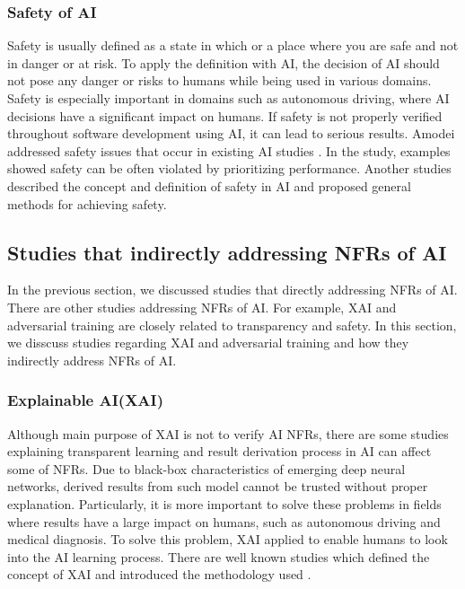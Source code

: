 \documentclass[symmetry,article,submit,moreauthors,pdftex]{Definitions/mdpi}
\begin{document}
\subsubsection{Safety of AI}

Safety is usually defined as a state in which or a place where you are safe and not in danger or at risk.
To apply the definition with AI, the decision of AI should not pose any danger or risks to humans while being used in various domains.
Safety is especially important in domains such as autonomous driving, where AI decisions have a significant impact on humans.
If safety is not properly verified throughout software development using AI, it can lead to serious results.
Amodei addressed safety issues that occur in existing AI studies \cite{safety-amodei}. 
In the study, examples showed safety can be often violated by prioritizing performance.
Another studies \cite{safety-juric,safety-leike} described the concept and definition of safety in AI and proposed general methods for achieving safety.

\subsection{Studies that indirectly addressing NFRs of AI}

In the previous section, we discussed studies that directly addressing NFRs of AI.
There are other studies addressing NFRs of AI.
For example, XAI and adversarial training are closely related to transparency and safety.
In this section, we disscuss studies regarding XAI and adversarial training and how they indirectly address NFRs of AI.

\subsubsection{Explainable AI(XAI)}

Although main purpose of XAI is not to verify AI NFRs, there are some studies explaining transparent learning and result derivation process in AI can affect some of NFRs.
Due to black-box characteristics of emerging deep neural networks, derived results from such model cannot be trusted without proper explanation.
Particularly, it is more important to solve these problems in fields where results have a large impact on humans, such as autonomous driving and medical diagnosis.
To solve this problem, XAI applied to enable humans to look into the AI learning process.
There are well known studies which defined the concept of XAI and introduced the methodology used  \cite{xai-samek, xai-arrieta,ai-medical-xai-holzinger,xai-transparency-ribeiro,xai-transparency-murdoch} .
\end{document}
